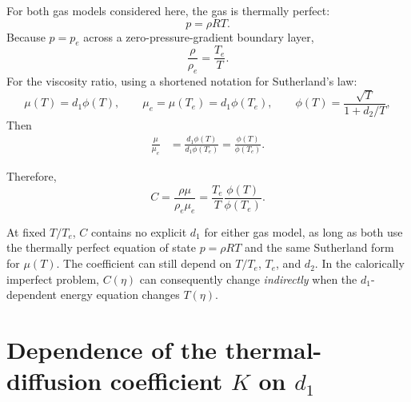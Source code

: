 \documentclass[11pt]{article}
\newcommand{\Te}{T_e}
\newcommand{\rhoe}{\rho_e}
\newcommand{\mue}{\mu_e}
\newcommand{\note}[2]{%
  \vspace{0.3em}%
  \noindent\colorbox{#1}{%
    \begin{minipage}{0.965\linewidth}
      #2
    \end{minipage}}%
  \vspace{0.3em}%
}
\begin{document}
For both gas models considered here, the gas is thermally perfect:
\begin{equation}
  p=\rho R T.
  \label{eq:thermally_perfect}
\end{equation}
Because \(p=p_e\) across a zero-pressure-gradient boundary layer,
\begin{equation}
  \frac{\rho}{\rhoe}
  =
  \frac{\Te}{T}.
  \label{eq:densityratio}
\end{equation}
For the viscosity ratio, using a shortened notation for Sutherland's law:
\begin{equation}
  \mu(T)=d_1\phi(T), \qquad
  \mue=\mu(\Te)=d_1\phi(\Te),\qquad
  \phi(T)=\frac{\sqrt{T}}{1+d_2/T},
  \label{eq:defs}
\end{equation}
Then
\begin{align}
  \frac{\mu}{\mue}
  &=
  \frac{d_1\phi(T)}{d_1\phi(\Te)}
   =
  \frac{\phi(T)}{\phi(\Te)}.
  \label{eq:muratio}
\end{align}
\note{HypLightGreen}{%
Therefore,
\begin{equation}
  C
  =
  \frac{\rho\mu}{\rhoe\mue}
  =
  \frac{\Te}{T}\frac{\phi(T)}{\phi(\Te)}.
  \label{eq:Ccancel}
\end{equation}

At fixed \(T/\Te\), \(C\) contains no explicit \(d_1\) for either gas model, as long as both use the thermally perfect equation of state \(p=\rho RT\) and the same Sutherland form for \(\mu(T)\). The coefficient can still depend on \(T/\Te\), \(T_e\), and \(d_2\). In the calorically imperfect problem, \(C(\eta)\) can consequently change \emph{indirectly} when the \(d_1\)-dependent energy equation changes \(T(\eta)\).}

\section{Dependence of the thermal-diffusion coefficient \texorpdfstring{\(K\)}{K} on \texorpdfstring{\(d_1\)}{d1}}
\label{sec:K_dependence}
\end{document}

